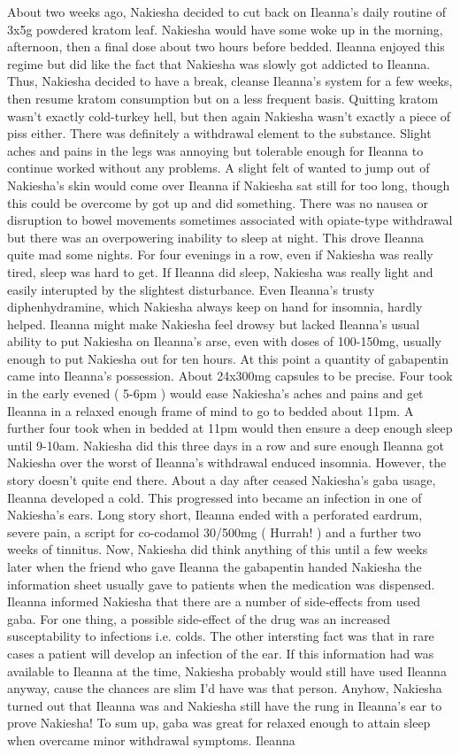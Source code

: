 \documentclass[12pt]{book}
\begin{document}
About two weeks ago, Nakiesha decided to cut back on Ileanna's daily routine of 3x5g powdered kratom leaf. Nakiesha would have some woke up in the morning, afternoon, then a final dose about two hours before bedded. Ileanna enjoyed this regime but did like the fact that Nakiesha was slowly got addicted to Ileanna. Thus, Nakiesha decided to have a break, cleanse Ileanna's system for a few weeks, then resume kratom consumption but on a less frequent basis. Quitting kratom wasn't exactly cold-turkey hell, but then again Nakiesha wasn't exactly a piece of piss either. There was definitely a withdrawal element to the substance. Slight aches and pains in the legs was annoying but tolerable enough for Ileanna to continue worked without any problems. A slight felt of wanted to jump out of Nakiesha's skin would come over Ileanna if Nakiesha sat still for too long, though this could be overcome by got up and did something. There was no nausea or disruption to bowel movements sometimes associated with opiate-type withdrawal but there was an overpowering inability to sleep at night. This drove Ileanna quite mad some nights. For four evenings in a row, even if Nakiesha was really tired, sleep was hard to get. If Ileanna did sleep, Nakiesha was really light and easily interupted by the slightest disturbance. Even Ileanna's trusty diphenhydramine, which Nakiesha always keep on hand for insomnia, hardly helped. Ileanna might make Nakiesha feel drowsy but lacked Ileanna's usual ability to put Nakiesha on Ileanna's arse, even with doses of 100-150mg, usually enough to put Nakiesha out for ten hours. At this point a quantity of gabapentin came into Ileanna's possession. About 24x300mg capsules to be precise. Four took in the early evened ( 5-6pm ) would ease Nakiesha's aches and pains and get Ileanna in a relaxed enough frame of mind to go to bedded about 11pm. A further four took when in bedded at 11pm would then ensure a deep enough sleep until 9-10am. Nakiesha did this three days in a row and sure enough Ileanna got Nakiesha over the worst of Ileanna's withdrawal enduced insomnia. However, the story doesn't quite end there. About a day after ceased Nakiesha's gaba usage, Ileanna developed a cold. This progressed into became an infection in one of Nakiesha's ears. Long story short, Ileanna ended with a perforated eardrum, severe pain, a script for co-codamol 30/500mg ( Hurrah! ) and a further two weeks of tinnitus. Now, Nakiesha did think anything of this until a few weeks later when the friend who gave Ileanna the gabapentin handed Nakiesha the information sheet usually gave to patients when the medication was dispensed. Ileanna informed Nakiesha that there are a number of side-effects from used gaba. For one thing, a possible side-effect of the drug was an increased susceptability to infections i.e. colds. The other intersting fact was that in rare cases a patient will develop an infection of the ear. If this information had was available to Ileanna at the time, Nakiesha probably would still have used Ileanna anyway, cause the chances are slim I'd have was that person. Anyhow, Nakiesha turned out that Ileanna was and Nakiesha still have the rung in Ileanna's ear to prove Nakiesha! To sum up, gaba was great for relaxed enough to attain sleep when overcame minor withdrawal symptoms. Ileanna 
\end{document}

